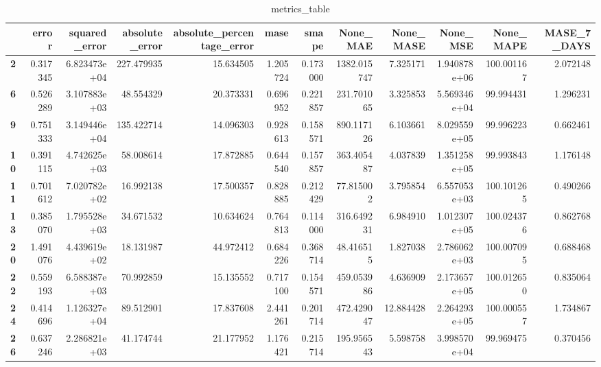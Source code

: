 \begin{table}[h]
\centering
\caption{metrics_table}
\label{table:Decrease variance}
\begin{tabular}{lrrrrrrrrrrr}
\toprule
{} &     error &  squared\_error &  absolute\_error &  absolute\_percentage\_error &      mase &     smape &     None\_MAE &  None\_MASE &      None\_MSE &   None\_MAPE &  MASE\_7\_DAYS \\
\midrule
\textbf{2 } &  0.317345 &   6.823473e+04 &      227.479935 &                  15.634505 &  1.205724 &  0.173000 &  1382.015747 &   7.325171 &  1.940878e+06 &  100.001167 &     2.072148 \\
\textbf{6 } &  0.526289 &   3.107883e+03 &       48.554329 &                  20.373331 &  0.696952 &  0.221857 &   231.701065 &   3.325853 &  5.569346e+04 &   99.994431 &     1.296231 \\
\textbf{9 } &  0.751333 &   3.149446e+04 &      135.422714 &                  14.096303 &  0.928613 &  0.158571 &   890.117126 &   6.103661 &  8.029559e+05 &   99.996223 &     0.662461 \\
\textbf{10} &  0.391115 &   4.742625e+03 &       58.008614 &                  17.872885 &  0.644540 &  0.157857 &   363.405487 &   4.037839 &  1.351258e+05 &   99.993843 &     1.176148 \\
\textbf{11} &  0.701612 &   7.020782e+02 &       16.992138 &                  17.500357 &  0.828885 &  0.212429 &    77.815002 &   3.795854 &  6.557053e+03 &  100.101265 &     0.490266 \\
\textbf{13} &  0.385070 &   1.795528e+03 &       34.671532 &                  10.634624 &  0.764813 &  0.114000 &   316.649231 &   6.984910 &  1.012307e+05 &  100.024376 &     0.862768 \\
\textbf{20} &  1.491076 &   4.439619e+02 &       18.131987 &                  44.972412 &  0.684226 &  0.368714 &    48.416515 &   1.827038 &  2.786062e+03 &  100.007095 &     0.688468 \\
\textbf{22} &  0.559193 &   6.588387e+03 &       70.992859 &                  15.135552 &  0.717100 &  0.154571 &   459.053986 &   4.636909 &  2.173657e+05 &  100.012650 &     0.835064 \\
\textbf{24} &  0.414696 &   1.126327e+04 &       89.512901 &                  17.837608 &  2.441261 &  0.201714 &   472.429047 &  12.884428 &  2.264293e+05 &  100.000557 &     1.734867 \\
\textbf{26} &  0.637246 &   2.286821e+03 &       41.174744 &                  21.177952 &  1.176421 &  0.215714 &   195.956543 &   5.598758 &  3.998570e+04 &   99.969475 &     0.370456 \\

\end{tabular}
\end{table}

